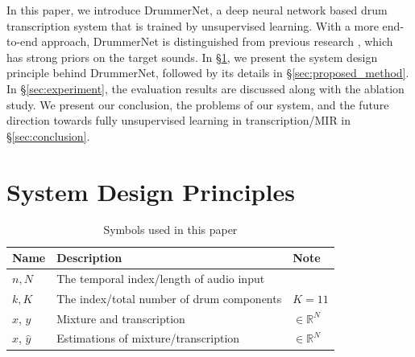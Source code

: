 \documentclass{article}
\newcommand{\squeeze}{\vspace{-0.15cm}}
\newcommand{\smallsqueeze}{\vspace{-0.1cm}}
\begin{document}
	In this paper, we introduce DrummerNet, a deep neural network based drum transcription system that is trained by unsupervised learning. With a more end-to-end approach, DrummerNet is distinguished from previous research \cite{abdallah2006unsupervised, yoshii2012unsupervised, berg2014unsupervised}, which has strong priors on the target sounds. In \S \ref{sec:systemdesign}, we present the system design principle behind DrummerNet, followed by its details in \S \ref{sec:proposed_method}. In \S \ref{sec:experiment}, the evaluation results are discussed along with the ablation study. We present our conclusion, the problems of our system, and the future direction towards fully unsupervised learning in transcription/MIR in \S \ref{sec:conclusion}.
	
	\squeeze
	\section{System Design Principles} \label{sec:systemdesign}
	\smallsqueeze
	
	\begin{table}[t]
		\centering
		\small
		\begin{tabular}{lll}
			Name                      & Description                  & Note                 \\ \toprule
			$n, N$ & The temporal index/length of audio input &  \\ 
			$k, K$ & The index/total number of drum components  & $K$$=$$11$ \\ 
			$x$, $y$ & Mixture and transcription & $\in \mathbb{R}^N$\\ 
			$\hat{x}$, $\hat{y}$ & Estimations of mixture/transcription & $\in \mathbb{R}^N$\\ 
			
		\end{tabular}
		\caption{Symbols used in this paper}
		\label{my-label}
	\end{table}
	
\end{document}
